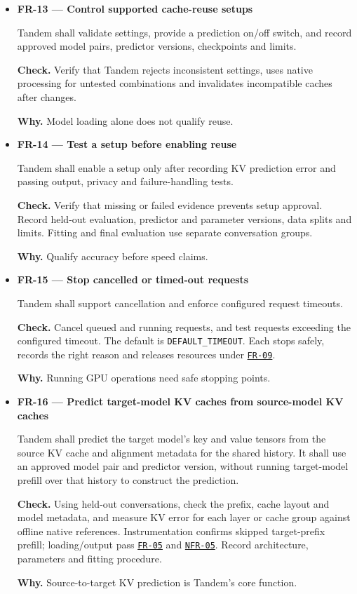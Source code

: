 \documentclass[12pt]{article}
\begin{document}
\begin{itemize}
\item {}\label{req:FR-13}
\textbf{FR-13 --- Control supported cache-reuse setups}\par
Tandem shall validate settings, provide a prediction on/off switch, and record approved model pairs, predictor versions, checkpoints and limits.\par
\textbf{Check.} Verify that Tandem rejects inconsistent settings, uses native processing for untested combinations and invalidates incompatible caches after changes.\par
\textbf{Why.} Model loading alone does not qualify reuse.


\item {}\label{req:FR-14}
\textbf{FR-14 --- Test a setup before enabling reuse}\par
Tandem shall enable a setup only after recording KV prediction error and passing output, privacy and failure-handling tests.\par
\textbf{Check.} Verify that missing or failed evidence prevents setup approval. Record held-out evaluation, predictor and parameter versions, data splits and limits. Fitting and final evaluation use separate conversation groups.\par
\textbf{Why.} Qualify accuracy before speed claims.


\item {}\label{req:FR-15}
\textbf{FR-15 --- Stop cancelled or timed-out requests}\par
Tandem shall support cancellation and enforce configured request timeouts.\par
\textbf{Check.} Cancel queued and running requests, and test requests exceeding the configured timeout. The default is \texttt{DEFAULT\_TIMEOUT}. Each stops safely, records the right reason and releases resources under \hyperref[req:FR-09]{\texttt{FR-09}}.\par
\textbf{Why.} Running GPU operations need safe stopping points.


\item {}\label{req:FR-16}
\textbf{FR-16 --- Predict target-model KV caches from source-model KV caches}\par
Tandem shall predict the target model's key and value tensors from the source KV cache and alignment metadata for the shared history. It shall use an approved model pair and predictor version, without running target-model prefill over that history to construct the prediction.\par
\textbf{Check.} Using held-out conversations, check the prefix, cache layout and model metadata, and measure KV error for each layer or cache group against offline native references. Instrumentation confirms skipped target-prefix prefill; loading/output pass \hyperref[req:FR-05]{\texttt{FR-05}} and \hyperref[req:NFR-05]{\texttt{NFR-05}}. Record architecture, parameters and fitting procedure.\par
\textbf{Why.} Source-to-target KV prediction is Tandem's core function.
\end{itemize}
\end{document}
